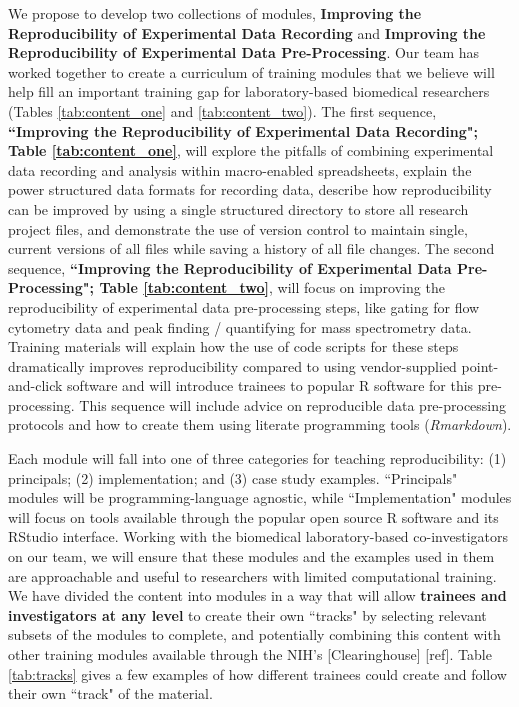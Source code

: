 \documentclass[pdftex,english,11pt,parskip=half]{scrartcl}
\begin{document}
We propose to develop two collections of modules, \textbf{Improving the
Reproducibility of Experimental Data Recording} and \textbf{Improving the
Reproducibility of Experimental Data Pre-Processing}. Our team has worked
together to create a curriculum of training modules that we believe will help
fill an important training gap for laboratory-based biomedical researchers
(Tables \ref{tab:content_one} and \ref{tab:content_two}). The first sequence,
\textbf{``Improving the Reproducibility of Experimental Data Recording"; Table
\ref{tab:content_one}}, will explore the pitfalls of combining experimental data
recording and analysis within macro-enabled spreadsheets, explain the power
structured data formats for recording data, describe how reproducibility can be
improved by using a single structured directory to store all research project
files, and demonstrate the use of version control to maintain single, current
versions of all files while saving a history of all file changes. The second
sequence, \textbf{``Improving the Reproducibility of Experimental Data
Pre-Processing"; Table \ref{tab:content_two}}, will focus on improving the
reproducibility of experimental data pre-processing steps, like gating for flow
cytometry data and peak finding / quantifying for mass spectrometry data.
Training materials will explain how the use of code scripts for these steps
dramatically improves reproducibility compared to using vendor-supplied
point-and-click software and will introduce trainees to popular R software for
this pre-processing. This sequence will include advice on reproducible data
pre-processing protocols and how to create them using literate programming tools
(\textit{Rmarkdown}).

Each module will fall into one of three categories for teaching reproducibility:
(1) principals; (2) implementation; and (3) case study examples. ``Principals"
modules will be programming-language agnostic, while ``Implementation" modules
will focus on tools available through the popular open source R software and its
RStudio interface. Working with the biomedical laboratory-based co-investigators
on our team, we will ensure that these modules and the examples used in them are
approachable and useful to researchers with limited computational training. We
have divided the content into modules in a way that will allow \textbf{trainees
and investigators at any level} to create their own ``tracks" by selecting
relevant subsets of the modules to complete, and potentially combining this
content with other training modules available through the NIH's [Clearinghouse]
[ref]. Table \ref{tab:tracks} gives a few examples of how different trainees
could create and follow their own ``track" of the material.
\end{document}
